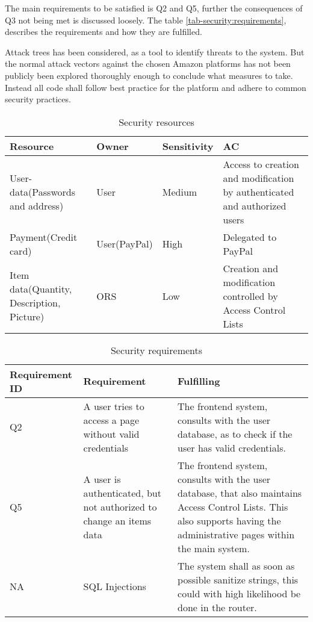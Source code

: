 The main requirements to be satisfied is Q2 and Q5, further the consequences of
Q3 not being met is discussed loosely. The table
\ref{tab-security:requirements}, describes the requirements and how they are
fulfilled.

Attack trees has been considered, as a tool to identify threats to the system.
But the normal attack vectors against the chosen Amazon platforms has not been
publicly been explored thoroughly enough to conclude what measures to take.
Instead all code shall follow best practice for the platform and adhere to
common security practices.

\begin{table}[ht]
    \centering
    \begin{tabular}{l | l | l | l}
        Resource & Owner & Sensitivity & AC \\ \hline
        User-data(Passwords and address) & User & Medium & Access to creation
            and modification by authenticated and authorized users \\ \hline
        Payment(Credit card) & User(PayPal) & High & Delegated to 
            PayPal \\ \hline
        Item data(Quantity, Description, Picture) & ORS & Low & Creation and
            modification controlled by Access Control Lists \\
    \end{tabular}
    \label{tab:security-resources}
    \caption{Security resources}
\end{table}

\begin{table}[ht]
    \centering
    \begin{tabular}{l | p{5cm} | p{7cm}}
        Requirement ID & Requirement & Fulfilling \\ \hline
        Q2 & A user tries to access a page without valid credentials &
        The frontend system, consults with the user database, as to check if the
        user has valid credentials. \\ \hline
        Q5 & A user is authenticated, but not authorized to change an items
        data & The frontend system, consults with the user database, that also
        maintains Access Control Lists. This also supports having the
        administrative pages within the main system. \\ \hline
        NA & SQL Injections & The system shall as soon as possible sanitize
            strings, this could with high likelihood be done in the router. \\
    \end{tabular}
    \label{tab:security-requirements}
    \caption{Security requirements}
\end{table}

